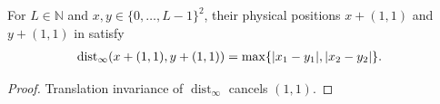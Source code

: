 \begin{lemma}
    \label{thm:peps_physical_integer_sup_distance}
    \leanok
    For $L\in\mathbb N$ and $x,y\in\{0,\ldots,L-1\}^2$, their physical positions
    $x+(1,1)$ and $y+(1,1)$ in \cite[Lemma~3.3]{OpenAI2026PolynomialPEPS} satisfy
    \begin{align}
        \operatorname{dist}_\infty(x+(1,1),y+(1,1))
         & =\max\{|x_1-y_1|,|x_2-y_2|\}.
        \notag
    \end{align}
\end{lemma}
\begin{proof}
    \leanok
    Translation invariance of $\operatorname{dist}_\infty$ cancels $(1,1)$.
\end{proof}

